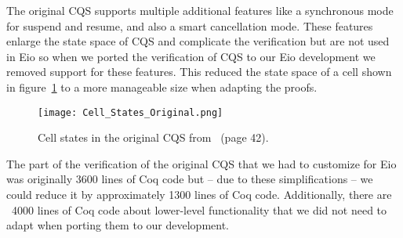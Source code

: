 The original CQS supports multiple additional features like a synchronous mode for suspend and resume, and also a smart cancellation mode.
These features enlarge the state space of CQS and complicate the verification but are not used in Eio so when we ported the verification of CQS to our Eio development we removed support for these features.
This reduced the state space of a cell shown in figure~\ref{fig:cqs-cell-states-original} to a more manageable size when adapting the proofs.

\begin{figure}[ht]
  \texttt{[image: Cell\_States\_Original.png]}
  \caption{Cell states in the original CQS from~\cite{koval2023cqs} (page 42).}
  \label{fig:cqs-cell-states-original}
\end{figure}

The part of the verification of the original CQS that we had to customize for Eio was originally 3600 lines of Coq code but -- due to these simplifications -- we could reduce it by approximately 1300 lines of Coq code.
Additionally, there are ~4000 lines of Coq code about lower-level functionality that we did not need to adapt when porting them to our development.




